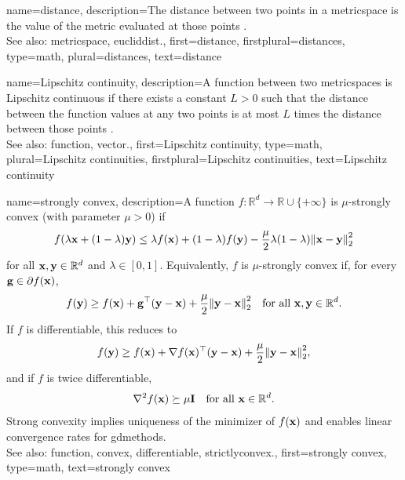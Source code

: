 {name={distance},
	description={The distance between two points in a \gls{metricspace} 
		is the value of the \gls{metric} evaluated at those points \cite{BasicRealAnalysis}.
		\\
		See also: \gls{metricspace}, \gls{eucliddist}.},
	first={distance},
	firstplural={distances},
	type=math,
	plural={distances},
	text={distance} 
}

{name={Lipschitz continuity},
	description={A \gls{function} between two \glspl{metricspace} is 
		Lipschitz \gls{continuous} if there exists a constant $L > 0$ such that 
		the \gls{distance} between the \gls{function} values at any two points is at 
		most $L$ times the \gls{distance} between those points \cite{BasicRealAnalysis}. 
		\\
		See also: \gls{function}, \gls{vector}.},
	first={Lipschitz continuity},
	type=math,
	plural={Lipschitz continuities},
	firstplural={Lipschitz continuities},
	text={Lipschitz continuity} 
}

{name={strongly convex},
	description={A \gls{function} $f:\mathbb{R}^d \rightarrow \mathbb{R}\cup\{+\infty\}$ is 
		$\mu$-strongly \gls{convex} (with \gls{parameter} $\mu>0$) if \cite{Bauschke:2017}
		\[
			f(\lambda \vx+(1-\lambda)\vy)
			\le
			\lambda f(\vx)+(1-\lambda)f(\vy)
			-
			\frac{\mu}{2}\lambda(1-\lambda)\normgeneric{\vx-\vy}{2}^{2}
		\]
		for all ${\bf x},{\bf y}\in\mathbb{R}^d$ and $\lambda\in[0,1]$.
		Equivalently, $f$ is $\mu$-strongly \gls{convex} if, for every 
		${\bf g}\in\partial f({\bf x})$, \cite[Sec. 3.4]{CvxBubeck2015}
		\[
			f(\vy) \ge f(\vx) + \vg^\top (\vy-\vx)
			+ \frac{\mu}{2}\normgeneric{\vy-\vx}{2}^{2}
			\quad \mbox{for all } \vx,\vy \in \mathbb{R}^{d}.
		\]
		If $f$ is \gls{differentiable}, this reduces to \cite[Sec. B.1.1]{CvxAlgBertsekas}
		\[
			f(\vy) \ge f(\vx) + \nabla f(\vx)^\top (\vy-\vx)
			+ \frac{\mu}{2}\normgeneric{\vy-\vx}{2}^{2},
		\]
		and if $f$ is twice \gls{differentiable},
		\[
			\nabla^2 f({\bf x}) \succeq \mu \mathbf{I} 
			\quad \mbox{for all } {\bf x} \in \mathbb{R}^{d}.
		\]
		Strong convexity implies uniqueness of the minimizer of $f({\bf x})$ and enables 
		linear \gls{convergence} rates for \glspl{gdmethod}.
					\\ 
		See also: \gls{function}, \gls{convex}, \gls{differentiable}, \gls{strictlyconvex}.},
	first={strongly convex},
	type=math,
	text={strongly convex} 
}

